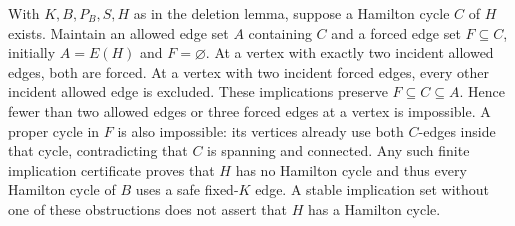 With $K,B,P_B,S,H$ as in the deletion lemma, suppose a Hamilton
cycle $C$ of $H$ exists. Maintain an allowed edge set $A$ containing
$C$ and a forced edge set $F\subseteq C$, initially $A=E(H)$ and
$F=\varnothing$. At a vertex with exactly two incident allowed
edges, both are forced. At a vertex with two incident forced edges,
every other incident allowed edge is excluded. These implications
preserve $F\subseteq C\subseteq A$. Hence fewer than two allowed
edges or three forced edges at a vertex is impossible. A proper
cycle in $F$ is also impossible: its vertices already use both
$C$-edges inside that cycle, contradicting that $C$ is spanning and
connected. Any such finite implication certificate proves that
$H$ has no Hamilton cycle and thus every Hamilton cycle of $B$
uses a safe fixed-$K$ edge. A stable implication set without one
of these obstructions does not assert that $H$ has a Hamilton cycle.
